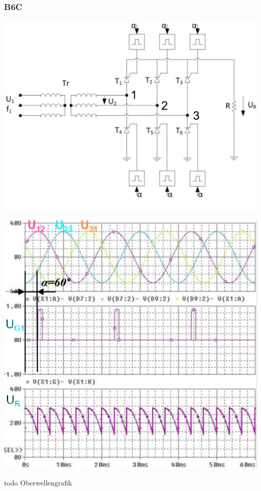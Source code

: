\subsubsection{B6C}
\vspace{-0.5cm}
\begin{minipage}{0.4\linewidth}
    \includegraphics[width=\linewidth]{images/GRB6c}
\end{minipage}
\begin{minipage}{0.35\linewidth}
    \centering 
    \includegraphics[width=\linewidth]{images/B6CKl}
    
\end{minipage}
\begin{minipage}{0.25\linewidth}
   todo Oberwellengrafik %
\end{minipage}
\newline

\clearpage